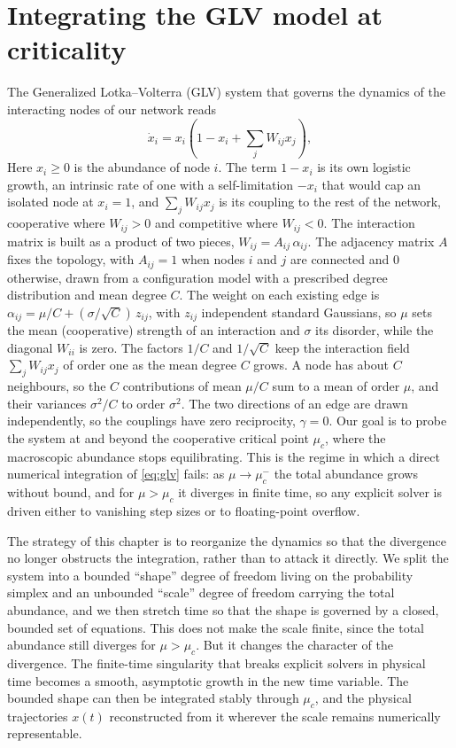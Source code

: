 \chapter{Integrating the GLV model at criticality}
\label{chap:rescaling}

The Generalized Lotka--Volterra (GLV) system that governs the dynamics of the
interacting nodes of our network reads
\begin{equation}
    \dot{x}_i = x_i \left( 1 - x_i + \sum_j W_{ij} x_j \right),
    \label{eq:glv}
\end{equation}
Here $x_i \ge 0$ is the abundance of node $i$. The term $1 - x_i$ is its own logistic
growth, an intrinsic rate of one with a self-limitation $-x_i$ that would cap an
isolated node at $x_i = 1$, and $\sum_j W_{ij} x_j$ is its coupling to the rest of the
network, cooperative where $W_{ij} > 0$ and competitive where $W_{ij} < 0$. The
interaction matrix is built as a product of two pieces, $W_{ij} = A_{ij}\,\alpha_{ij}$.
The adjacency matrix $A$ fixes the topology, with $A_{ij} = 1$ when nodes $i$ and $j$ are
connected and $0$ otherwise, drawn from a configuration model with a prescribed degree
distribution and mean degree $C$. The weight on each existing edge is
$\alpha_{ij} = \mu/C + (\sigma/\sqrt{C})\,z_{ij}$, with $z_{ij}$ independent standard
Gaussians, so $\mu$ sets the mean (cooperative) strength of an interaction and $\sigma$
its disorder, while the diagonal $W_{ii}$ is zero. The factors $1/C$ and $1/\sqrt{C}$
keep the interaction field $\sum_j W_{ij} x_j$ of order one as the mean degree $C$
grows. A node has about $C$ neighbours, so the $C$ contributions of mean $\mu/C$ sum to
a mean of order $\mu$, and their variances $\sigma^2/C$ to order $\sigma^2$. The two
directions of an edge are drawn independently, so the couplings have zero reciprocity,
$\gamma = 0$. Our goal is to probe the system at and
beyond the cooperative critical point $\mu_c$, where the macroscopic abundance
stops equilibrating. This is the regime in which a direct numerical integration
of \eqref{eq:glv} fails: as $\mu \to \mu_c^{-}$ the total abundance grows without
bound, and for $\mu > \mu_c$ it diverges in finite time, so any explicit solver
is driven either to vanishing step sizes or to floating-point overflow.

The strategy of this chapter is to reorganize the dynamics so that the
divergence no longer obstructs the integration, rather than to attack it directly.
We split the system into a bounded ``shape'' degree of freedom living on the
probability simplex and an unbounded ``scale'' degree of freedom carrying the
total abundance, and we then stretch time so that the shape is governed by a
closed, bounded set of equations. This does not make the scale finite, since the
total abundance still diverges for $\mu > \mu_c$. But it changes the character
of the divergence. The finite-time singularity that breaks explicit solvers in
physical time becomes a smooth, asymptotic growth in the new time variable. The
bounded shape can then be integrated stably through $\mu_c$, and the physical
trajectories $x(t)$ reconstructed from it wherever the scale remains numerically
representable.

